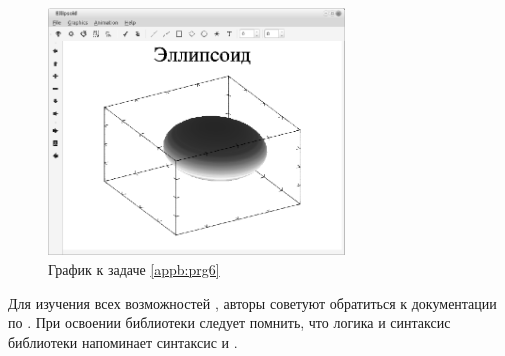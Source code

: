 \begin{figure}[htb]
\begin{center}
\includegraphics[width=0.7\textwidth]{img/ris_appb_8}
\caption{График к задаче \ref{appb:prg6}}
\label{appb:refDrawing7}
\end{center}
\end{figure}

Для изучения всех возможностей , авторы советуют обратиться к документации по . 
При освоении библиотеки  следует помнить, что логика и синтаксис библиотеки напоминает 
синтаксис  и  .

